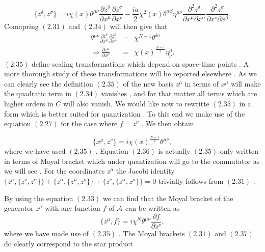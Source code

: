 \documentclass[a4paper,12pt]{article}
\begin{document}
\begin{equation}
\{z^{\delta},z^{\sigma}\}= i{\chi}(x){\theta}^{{\mu}{\nu}}
\frac{\partial{z^{\delta}}}{\partial{x^{\mu}}}\frac{\partial{z^{\sigma}}}{\partial{x^{\nu}}}
-
\frac{ia}{2}{\chi}^2(x){\theta}^{{\alpha}{\beta}}{\eta}^{{\mu}{\nu}}
\frac{{\partial}^2{z^{\delta}}}{\partial{x^{\mu}}
\partial{x^{\alpha}}}\frac{{\partial}^2{z^{\sigma}}}{\partial{x^{\nu}}\partial{x^{\beta}}}.
\end{equation}
Comapring $(2.31)$ and $(2.34)$ will then give that
\begin{eqnarray}
{\theta}^{{\mu}{\nu}} \frac{\partial{z^{\delta}}}{\partial{x^{\mu}}}\frac{\partial{z^{\sigma}}}{\partial{x^{\nu}}}&=&{\chi}^{N-1}{\theta}^{{\delta}{\sigma}}\nonumber\\
{\Longrightarrow}
\frac{\partial{z^{\mu}}}{\partial{x^{\nu}}}&=&{\chi(x)}^{\frac{N-1}{2}}\eta^{\mu}_{\nu}.
\end{eqnarray}
$(2.35)$ define scaling transformations which depend on space-time
points . A more thorough study of these transformations will be
reported elsewhere . As we can clearly see the definition $(2.35)$
of the new basis $z^{\mu}$ in terms of $x^{\mu}$ will make the
quadratic term in $(2.34)$ vanishes , and for that matter all
terms which are higher orders in $C$ will also vanish. We would
like now to rewritte $(2.35)$ in a form which is better suited for
quantization . To this end we make use of the equation $(2.27)$
for the case where $f=z^{\nu}$ . We then obtain


\begin{equation}
\{x^{\mu},z^{\nu}\}=i{{\chi}(x)}^{\frac{N+1}{2}}{\theta}^{{\mu}{\nu}},
\end{equation}
where we have used $(2.35)$ . Equation $(2.36)$ is actually
$(2.35)$ only written in terms of Moyal bracket which under
quantization will go to the commutator
 as we will see . For the coordinates $z^{\mu}$ the Jacobi identity $\{z^{\mu},\{z^{\nu},z^{\alpha}\}\} +
 \{z^{\alpha},\{z^{\mu},z^{\nu}\}\} + \{z^{\nu},\{z^{\alpha},z^{\mu}\}\} = 0$ trivially follows from $(2.31)$ .

By using the equation $(2.33)$ we can find that the Moyal bracket
of the generator $z^{\mu}$ with any function $f$ of ${\cal A}$
can be written as
\begin{equation}
\{z^{\mu},f\}=i{\chi}^N{\theta}^{{\mu}{\nu}}\frac{\partial{f}}{\partial{z^{\nu}}},
\end{equation}
where we have made use of $(2.35)$ . The Moyal brackets $(2.31)$
and $(2.37)$ do clearly correspond to the star product
\end{document}
